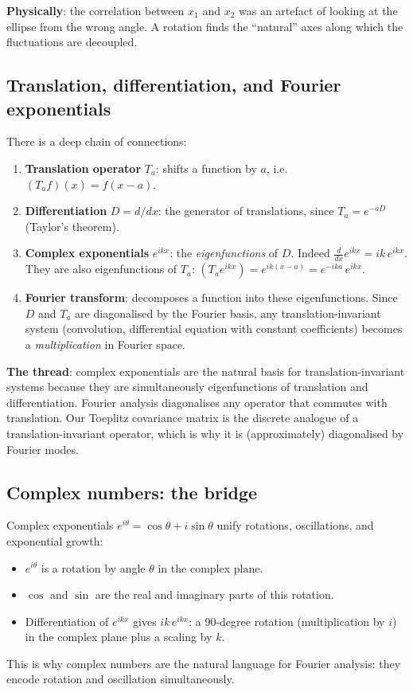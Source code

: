 \documentclass[11pt,a4paper]{article}
\begin{document}
\textbf{Physically}: the correlation between $x_1$ and $x_2$ was an artefact of looking at the ellipse from the wrong angle.  A rotation finds the ``natural'' axes along which the fluctuations are decoupled.

\subsection{Translation, differentiation, and Fourier exponentials}

There is a deep chain of connections:
\begin{enumerate}[nosep]
  \item \textbf{Translation operator} $T_a$: shifts a function by $a$, i.e.\ $(T_a f)(x) = f(x - a)$.
  \item \textbf{Differentiation} $D = d/dx$: the generator of translations, since $T_a = e^{-aD}$ (Taylor's theorem).
  \item \textbf{Complex exponentials} $e^{ikx}$: the \emph{eigenfunctions} of $D$.  Indeed $\frac{d}{dx}e^{ikx} = ik\,e^{ikx}$.  They are also eigenfunctions of $T_a$: $(T_a e^{ikx}) = e^{ik(x-a)} = e^{-ika}\,e^{ikx}$.
  \item \textbf{Fourier transform}: decomposes a function into these eigenfunctions.  Since $D$ and $T_a$ are diagonalised by the Fourier basis, any translation-invariant system (convolution, differential equation with constant coefficients) becomes a \emph{multiplication} in Fourier space.
\end{enumerate}

\textbf{The thread}: complex exponentials are the natural basis for translation-invariant systems because they are simultaneously eigenfunctions of translation and differentiation.  Fourier analysis diagonalises any operator that commutes with translation.  Our Toeplitz covariance matrix is the discrete analogue of a translation-invariant operator, which is why it is (approximately) diagonalised by Fourier modes.

\subsection{Complex numbers: the bridge}

Complex exponentials $e^{i\theta} = \cos\theta + i\sin\theta$ unify rotations, oscillations, and exponential growth:
\begin{itemize}[nosep]
  \item $e^{i\theta}$ is a rotation by angle $\theta$ in the complex plane.
  \item $\cos$ and $\sin$ are the real and imaginary parts of this rotation.
  \item Differentiation of $e^{ikx}$ gives $ik\,e^{ikx}$: a 90-degree rotation (multiplication by $i$) in the complex plane plus a scaling by $k$.
\end{itemize}
This is why complex numbers are the natural language for Fourier analysis: they encode rotation and oscillation simultaneously.
\end{document}
